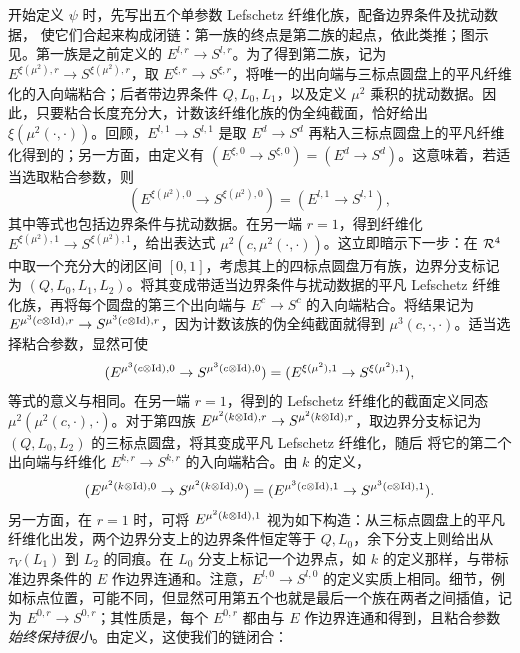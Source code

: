 开始定义 $\psi$ 时，先写出五个单参数 Lefschetz 纤维化族，配备边界条件及扰动数据，
使它们合起来构成闭链：第一族的终点是第二族的起点，依此类推；图示见。第一族是之前定义的 $E^{l,r}\to S^{l,r}$。为了得到第二族，记为 $E^{\xi(\mu^2),r}\to S^{\xi(\mu^2),r}$，取 $E^{\xi,r}\to S^{\xi,r}$，将唯一的出向端与三标点圆盘上的平凡纤维化的入向端粘合；后者带边界条件 $Q,L_0,L_1$，以及定义 $\mu^2$ 乘积的扰动数据。因此，只要粘合长度充分大，计数该纤维化族的伪全纯截面，恰好给出 $\xi(\mu^2(\cdot,\cdot))$。回顾，$E^{l,1}\to S^{l,1}$ 是取 $E^d\to S^d$ 再粘入三标点圆盘上的平凡纤维化得到的；另一方面，由定义有 $(E^{\xi,0}\to S^{\xi,0})=(E^d\to S^d)$。这意味着，若适当选取粘合参数，则
\begin{equation}\label{eq:17.20}
(E^{\xi(\mu^2),0}\to S^{\xi(\mu^2),0})=(E^{l,1}\to S^{l,1}),
\end{equation}
其中等式也包括边界条件与扰动数据。在另一端 $r=1$，得到纤维化 $E^{\xi(\mu^2),1}\to S^{\xi(\mu^2),1}$，给出表达式 $\mu^2(c,\mu^2(\cdot,\cdot))$。这立即暗示下一步：在 $\mathcal R^4$ 中取一个充分大的闭区间 $[0,1]$，考虑其上的四标点圆盘万有族，边界分支标记为 $(Q,L_0,L_1,L_2)$。将其变成带适当边界条件与扰动数据的平凡 Lefschetz 纤维化族，再将每个圆盘的第三个出向端与 $E^c\to S^c$ 的入向端粘合。将结果记为 $E^{\mu^3(c\otimes\operatorname{Id}),r}\to S^{\mu^3(c\otimes\operatorname{Id}),r}$，因为计数该族的伪全纯截面就得到 $\mu^3(c,\cdot,\cdot)$。适当选择粘合参数，显然可使
\[
(E^{\mu^3(c\otimes\operatorname{Id}),0}\to S^{\mu^3(c\otimes\operatorname{Id}),0})
=(E^{\xi(\mu^2),1}\to S^{\xi(\mu^2),1}),
\]
等式的意义与相同。在另一端 $r=1$，得到的 Lefschetz 纤维化的截面定义同态 $\mu^2(\mu^2(c,\cdot),\cdot)$。对于第四族 $E^{\mu^2(k\otimes\operatorname{Id}),r}\to S^{\mu^2(k\otimes\operatorname{Id}),r}$，取边界分支标记为 $(Q,L_0,L_2)$ 的三标点圆盘，将其变成平凡 Lefschetz 纤维化，随后
将它的第二个出向端与纤维化 $E^{k,r}\to S^{k,r}$ 的入向端粘合。由 $k$ 的定义，
\[
(E^{\mu^2(k\otimes\operatorname{Id}),0}\to S^{\mu^2(k\otimes\operatorname{Id}),0})
=(E^{\mu^3(c\otimes\operatorname{Id}),1}\to S^{\mu^3(c\otimes\operatorname{Id}),1}).
\]
另一方面，在 $r=1$ 时，可将 $E^{\mu^2(k\otimes\operatorname{Id}),1}$ 视为如下构造：从三标点圆盘上的平凡纤维化出发，两个边界分支上的边界条件恒定等于 $Q,L_0$，余下分支上则给出从 $\tau_V(L_1)$ 到 $L_2$ 的同痕。在 $L_0$ 分支上标记一个边界点，如 $k$ 的定义那样，与带标准边界条件的 $E$ 作边界连通和。注意，$E^{l,0}\to S^{l,0}$ 的定义实质上相同。细节，例如标点位置，可能不同，但显然可用第五个也就是最后一个族在两者之间插值，记为 $E^{0,r}\to S^{0,r}$；其性质是，每个 $E^{0,r}$ 都由与 $E$ 作边界连通和得到，且粘合参数\emph{始终保持很小}。由定义，这使我们的链闭合：
